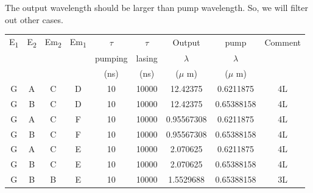 \documentclass[a4paper,11pt]{article}
\begin{document}
The output wavelength should be larger than pump wavelength. So, we will filter out other cases.

\begin{center}
\begin{tabular}{|c|c|c|c|c|c|c|c|c|}
\hline
E\textsubscript{1} & E\textsubscript{2} & Em\textsubscript{2} & Em\textsubscript{1} & \(\tau\) & \(\tau\) & Output & pump & Comment\\
 &  &  &  & pumping & lasing & \(\lambda\) & \(\lambda\) & \\
 &  &  &  & (ns) & (ns) & (\(\mu\) m) & (\(\mu\) m) & \\
\hline
G & A & C & D & 10 & 10000 & 12.42375 & 0.6211875 & 4L\\
G & B & C & D & 10 & 10000 & 12.42375 & 0.65388158 & 4L\\
G & A & C & F & 10 & 10000 & 0.95567308 & 0.6211875 & 4L\\
G & B & C & F & 10 & 10000 & 0.95567308 & 0.65388158 & 4L\\
G & A & C & E & 10 & 10000 & 2.070625 & 0.6211875 & 4L\\
G & B & C & E & 10 & 10000 & 2.070625 & 0.65388158 & 4L\\
G & B & B & E & 10 & 10000 & 1.5529688 & 0.65388158 & 3L\\
\hline
\end{tabular}
\end{center}
\end{document}
